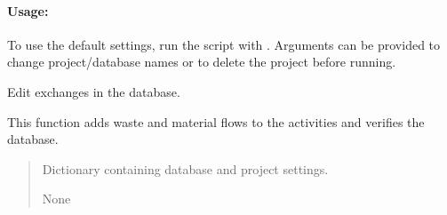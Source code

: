 \documentclass[letterpaper,10pt,english]{sphinxmanual}
\begin{document}
\paragraph{Usage:}
\label{\detokenize{WasteAndMaterialFootprint:usage}}
\sphinxAtStartPar
To use the default settings, run the script with . 
Arguments can be provided to change project/database names or to delete the project before running.

\begin{fulllineitems}
\label{\detokenize{WasteAndMaterialFootprint:WasteAndMaterialFootprint.main.EditExchanges}}
\pysigstartsignatures
{}
\pysigstopsignatures
\sphinxAtStartPar
Edit exchanges in the database.

\sphinxAtStartPar
This function adds waste and material flows to the activities and verifies the database.
\begin{quote}\begin{description}
\sphinxAtStartPar
{} \textendash{} Dictionary containing database and project settings.

\sphinxAtStartPar
None

\end{description}\end{quote}

\end{fulllineitems}

\end{document}
